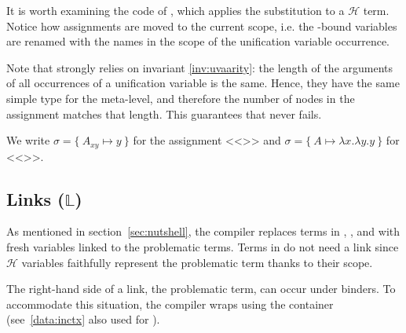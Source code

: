 \documentclass[sigconf,natbib=false,review]{acmart}
\newcommand{\Fo}{\texorpdfstring{\ensuremath{\mathcal{F}\xspace}}{F}} %
\newcommand{\Ho}{\texorpdfstring{\ensuremath{\mathcal{H}}\xspace}{H}}
\newcommand{\linkStore}{\texorpdfstring{\ensuremath{\mathbb{L}}\xspace}{L}}
\begin{document}
% 
It is worth examining the code of , which
applies the substitution to a \Ho{} term. Notice how assignments are moved
to the current scope, i.e. the -bound variables are renamed
with the names in the scope of the unification variable occurrence.



\noindent
Note that  strongly relies on invariant \ref{inv:uvaarity}: the length
of the arguments of all occurrences of a unification variable is the same. Hence,
they have the same simple type for the meta-level, and therefore the number of
 nodes in the assignment matches that length.
This guarantees that  never fails.



We write $\sigma = \{~ A_{xy} \mapsto y ~\}$ for the assignment
<<>> and $\sigma = \{~ A \mapsto \lambda x.\lambda y.y ~\}$
for <<>>.

\subsection{Links (\linkStore)}

\noindent
As mentioned in section~\ref{sec:nutshell}, the compiler
replaces terms in \maybeeta, \maybebeta, and \notllambda with fresh
variables linked to the problematic terms. Terms in \maybebeta do not
need a link since \Ho{} variables faithfully represent
the problematic term thanks to their scope.



\noindent
The right-hand side of a link, the problematic term, can occur under binders.
To accommodate this situation, the compiler wraps  using
the  container (see~\ref{data:inctx} also used for ).
\end{document}
